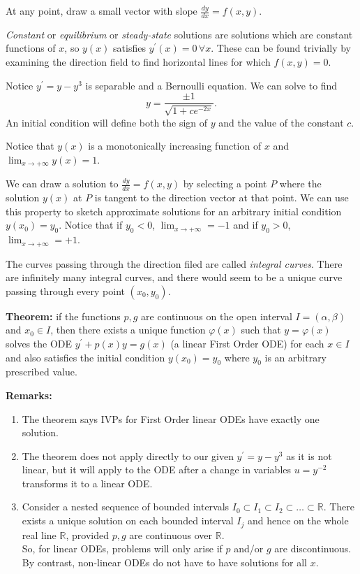 \documentclass[11pt]{article}
\newcommand{\fdx}{\frac{dy}{dx}} %
\newcommand{\yp}{y^{\prime}}
\begin{document}
	At any point, draw a small vector with slope $\fdx = f(x,y)$.

	\emph{Constant} or \emph{equilibrium} or \emph{steady-state} solutions are solutions which are constant functions of $x$, so $y(x)$ satisfies $\yp(x) = 0 \, \forall x$. These can be found trivially by examining the direction field to find horizontal lines for which $f(x,y) = 0$.

	Notice $\yp = y - y^3$ is separable and a Bernoulli equation. We can solve to find
		$$ y = \frac{\pm 1}{\sqrt{1 + c e^{-2x}}}. $$
	An initial condition will define both the sign of $y$ and the value of the constant $c$.

	Notice that $y(x)$ is a monotonically increasing function of $x$ and $\lim_{x \to + \infty} y(x) = 1$.

	We can draw a solution to $\fdx = f(x,y)$ by selecting a point $P$ where the solution $y(x)$ at $P$ is tangent to the direction vector at that point. We can use this property to sketch approximate solutions for an arbitrary initial condition $y(x_0) = y_0$. Notice that if $y_0 < 0$, $\lim_{x \to + \infty} = -1$ and if $y_0 > 0$, $\lim_{x \to + \infty} = +1$.

	The curves passing through the direction filed are called \emph{integral curves}. There are infinitely many integral curves, and there would seem to be a unique curve passing through every point $(x_0, y_0)$.

	\textbf{Theorem:} if the functions $p,g$ are continuous on the open interval $I = (\alpha, \beta)$ and $x_0 \in I$, then there exists a unique function $\varphi(x)$ such that $y = \varphi(x)$ solves the ODE $\yp + p(x)y = g(x)$ (a linear First Order ODE) for each $x \in I$ and also satisfies the initial condition $y(x_0) = y_0$ where $y_0$ is an arbitrary prescribed value.

	\textbf{Remarks:}
		\begin{enumerate}
			\item The theorem says IVPs for First Order linear ODEs have exactly one solution.
			\item The theorem does not apply directly to our given $\yp = y - y^3$ as it is not linear, but it will apply to the ODE after a change in variables $u = y^{-2}$ transforms it to a linear ODE.
			\item Consider a nested sequence of bounded intervals $I_0 \subset I_1 \subset I_2 \subset \ldots \subset \mathbb{R}$. There exists a unique solution on each bounded interval $I_j$ and hence on the whole real line $\mathbb{R}$, provided $p,g$ are continuous over $\mathbb{R}$. \\
			So, for linear ODEs, problems will only arise if $p$ and/or $g$ are discontinuous. By contrast, non-linear ODEs do not have to have solutions for all $x$.
		\end{enumerate}
\end{document}
